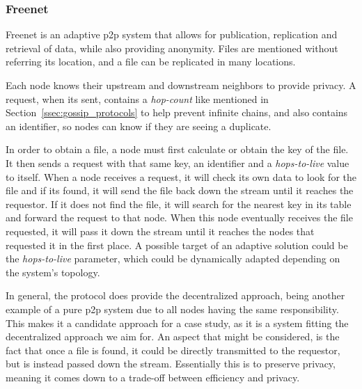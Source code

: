 \subsubsection{Freenet}
\label{sssec:freenet}
\par Freenet \cite{Clarke2001} is an adaptive \gls{p2p} system that allows for publication, replication and retrieval of data, while also providing anonymity. Files are mentioned without referring its location, and a file can be replicated in many locations.
\par Each node knows their upstream and downstream neighbors to provide privacy. A request, when its sent, contains a \textit{hop-count} like mentioned in Section~\ref{ssec:gossip_protocols} to help prevent infinite chains, and also contains an identifier, so nodes can know if they are seeing a duplicate.
\par In order to obtain a file, a node must first calculate or obtain the key of the file. It then sends a request with that same key, an identifier and a \textit{hops-to-live} value to itself. When a node receives a request, it will check its own data to look for the file and if its found, it will send the file back down the stream until it reaches the requestor. If it does not find the file, it will search for the nearest key in its table and forward the request to that node. When this node eventually receives the file requested, it will pass it down the stream until it reaches the nodes that requested it in the first place. A possible target of an adaptive solution could be the \textit{hops-to-live} parameter, which could be dynamically adapted depending on the system's topology.%
\par In general, the protocol does provide the decentralized approach, being another example of a pure \gls{p2p} system due to all nodes having the same responsibility. This makes it a candidate approach for a case study, as it is a system fitting the decentralized approach we aim for. %
An aspect that might be considered, is the fact that once a file is found, it could be directly transmitted to the requestor, but is instead passed down the stream. Essentially this is to preserve privacy, meaning it comes down to a trade-off between efficiency and privacy.
%
%
%
